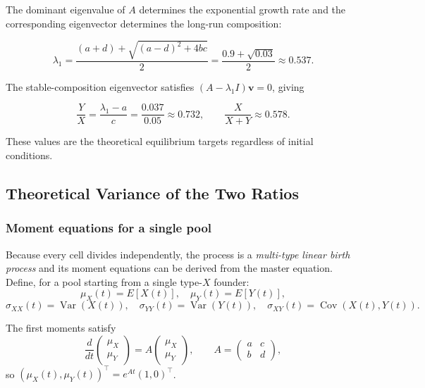 \documentclass[12pt]{article}
\begin{document}
The dominant eigenvalue of $A$ determines the exponential growth rate and
the corresponding eigenvector determines the long-run composition:

\[
  \lambda_1
  = \frac{(a+d) + \sqrt{(a-d)^2 + 4bc}}{2}
  = \frac{0.9 + \sqrt{0.03}}{2}
  \approx 0.537.
\]

The stable-composition eigenvector satisfies
$(A - \lambda_1 I)\mathbf{v} = 0$, giving

\[
  \frac{Y}{X}
  = \frac{\lambda_1 - a}{c}
  = \frac{0.037}{0.05}
  \approx 0.732,
  \qquad
  \frac{X}{X+Y}
  \approx 0.578.
\]

These values are the theoretical equilibrium targets regardless of initial
conditions.


\subsection{Theoretical Variance of the Two Ratios}
\label{sec:variance}

\subsubsection{Moment equations for a single pool}

Because every cell divides independently, the process is a \emph{multi-type
linear birth process} and its moment equations can be derived from the master
equation.  Define, for a pool starting from a single type-$X$ founder:
\[
\mu_X(t) = E[X(t)], \quad \mu_Y(t) = E[Y(t)],
\]
\[
\sigma_{XX}(t) = \operatorname{Var}(X(t)), \quad
\sigma_{YY}(t) = \operatorname{Var}(Y(t)), \quad
\sigma_{XY}(t) = \operatorname{Cov}(X(t), Y(t)).
\]

The first moments satisfy
\begin{equation}
	\frac{d}{dt}\begin{pmatrix}\mu_X\\\mu_Y\end{pmatrix}
	= A\begin{pmatrix}\mu_X\\\mu_Y\end{pmatrix},
	\qquad A = \begin{pmatrix}a & c \\ b & d\end{pmatrix},
	\label{eq:mean_ode}
\end{equation}
so $(\mu_X(t),\mu_Y(t))^{\top} = e^{At}(1,0)^{\top}$.
\end{document}
